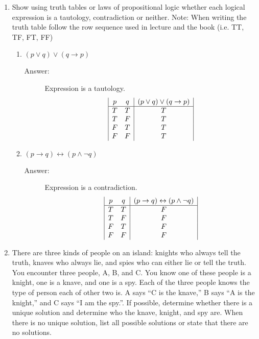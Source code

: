 \documentclass[12pt, oneside]{article}
\begin{document}
\begin{enumerate}
\item  Show using truth tables or laws of propositional logic whether each logical expression is a tautology, contradiction or neither. Note: When writing the truth table follow the row sequence used in lecture and the book  (i.e. TT, TF, FT, FF)
\begin{enumerate}
    \item $(p \lor q) \lor (q \to p)$
    \begin{description}
        \item[Answer:] Expression is a tautology.
        \begin{displaymath}
            \begin{array}{|c c|c|}
            p & q & (p\vee q) \vee (q\rightarrow p)\\
            \hline
            T & T & T\\
            T & F & T\\
            F & T & T\\
            F & F & T\\
            \end{array}
        \end{displaymath} 
    \end{description}
    \item $(p \to q) \leftrightarrow (p \land \neg q)$
    \begin{description}
        \item[Answer:] Expression is a contradiction.
        \begin{displaymath}
            \begin{array}{|c c|c|}
            p & q & (p\rightarrow q) \leftrightarrow (p \wedge \lnot q)\\
            \hline
            T & T & F\\
            T & F & F\\
            F & T & F\\
            F & F & F\\
            \end{array}
        \end{displaymath} 
    \end{description}
\end{enumerate}



\item There are three kinds of people on an island: knights who always tell the truth, knaves who always lie, and spies who can either lie or tell the truth. You encounter three people, A, B, and C. You know one of these people is a knight, one is a knave, and one is a spy. Each of the three people knows the type of person each of other two is. A says “C is the knave,” B says “A is the knight,” and C says “I am the spy.”. If possible, determine whether there is a unique solution and determine who the knave, knight, and spy are. When there is no unique solution, list all possible solutions or state that there are no solutions.


\end{enumerate}
\end{document}

